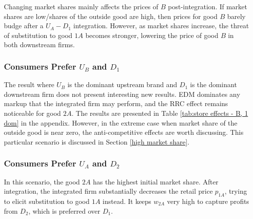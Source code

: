 \documentclass[12pt]{article}%
\begin{document}
Changing market shares mainly affects the prices of $B$ post-integration. If market shares are low/shares of the outside good are high, then prices for good $B$ barely budge after a $U_A-D_1$ integration. However, as market shares increase, the threat of substitution to good $1A$ becomes stronger, lowering the price of good $B$ in both downstream firms. 

\subsubsection{Consumers Prefer $U_B$ and $D_1$}
The result where $U_B$ is the dominant upstream brand and $D_1$ is the dominant downstream firm does not present interesting new results. EDM dominates any markup that the integrated firm may perform, and the RRC effect remains noticeable for good $2A$. The results are presented in Table \ref{tab:store effects - B, 1 dom} in the appendix. However, in the extreme case when market share of the outside good is near zero, the anti-competitive effects are worth discussing. This particular scenario is discussed in Section \ref{high market share}.

\subsubsection{Consumers Prefer $U_A$ and $D_2$}
In this scenario, the good $2A$ has the highest initial market share. After integration, the integrated firm substantially decreases the retail price $p_{1A}$, trying to elicit substitution to good $1A$ instead. It keeps $w_{2A}$ very high to capture profits from $D_2$, which is preferred over $D_1$. 
\end{document}

